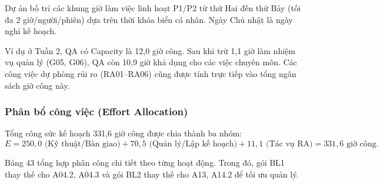 Dự án bố trí các khung giờ làm việc linh hoạt P1/P2 từ thứ Hai đến thứ Bảy (tối đa 2 giờ/người/phiên) dựa trên thời khóa biểu cá nhân. Ngày Chủ nhật là ngày nghỉ kế hoạch.

Ví dụ ở Tuần 2, QA có Capacity là 12,0 giờ công. Sau khi trừ 1,1 giờ làm nhiệm vụ quản lý (G05, G06), QA còn 10,9 giờ khả dụng cho các việc chuyên môn. Các công việc dự phòng rủi ro (RA01--RA06) cũng được tính trực tiếp vào tổng ngân sách giờ công này.

\subsubsection{Phân bổ công việc (Effort Allocation)}

Tổng công sức kế hoạch 331,6 giờ công được chia thành ba nhóm:
\[E = 250{,}0 \text{ (Kỹ thuật/Bàn giao)} + 70{,}5 \text{ (Quản lý/Lập kế hoạch)} + 11{,}1 \text{ (Tác vụ RA)} = 331{,}6\text{ giờ công}.\]

Bảng 43 tổng hợp phân công chi tiết theo từng hoạt động. Trong đó, gói BL1 thay thế cho A04.2, A04.3 và gói BL2 thay thế cho A13, A14.2 để tối ưu quản lý.

